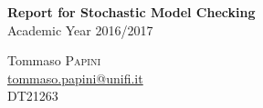 
\begin{center}

  {\huge\bfseries Report for Stochastic Model Checking}\\
  Academic Year 2016/2017\\[0.8cm]

  \begin{minipage}{0.55\textwidth}
    Tommaso \textsc{Papini}\\
    \href{mailto:tommaso.papini@unifi.it}{tommaso.papini@unifi.it}\\
    DT21263
  \end{minipage}
  \begin{minipage}{0.4\textwidth}
  \end{minipage}
\end{center}
